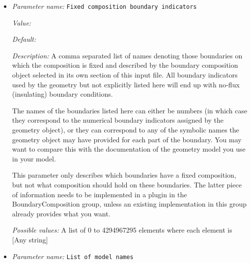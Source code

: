 \begin{itemize}
A warning for models with melt transport: In models with fluid flow, some compositional fields (in particular the porosity) might be transported with the fluid velocity, and would need to set the constraints based on the fluid velocity. However, this is currently not possible, because we reuse the same matrix for all compositional fields, and therefore can not use different constraints for different fields. Consequently, we set this parameter to true by default in models where melt transport is enabled. Be aware that if you change this default setting, you will not use the melt velocity, but the solid velocity to determine on which parts of the boundaries there is outflow.


{\it Possible values:} Any one of true, false, false for models without melt
\item {\it Parameter name:} {\tt Fixed composition boundary indicators}
\label{parameters:Boundary composition model/Fixed composition boundary indicators}
\label{parameters:Boundary_20composition_20model/Fixed_20composition_20boundary_20indicators}


{\it Value:} 


{\it Default:} 


{\it Description:} A comma separated list of names denoting those boundaries on which the composition is fixed and described by the boundary composition object selected in its own section of this input file. All boundary indicators used by the geometry but not explicitly listed here will end up with no-flux (insulating) boundary conditions.

The names of the boundaries listed here can either be numbers (in which case they correspond to the numerical boundary indicators assigned by the geometry object), or they can correspond to any of the symbolic names the geometry object may have provided for each part of the boundary. You may want to compare this with the documentation of the geometry model you use in your model.

This parameter only describes which boundaries have a fixed composition, but not what composition should hold on these boundaries. The latter piece of information needs to be implemented in a plugin in the BoundaryComposition group, unless an existing implementation in this group already provides what you want.


{\it Possible values:} A list of 0 to 4294967295 elements where each element is [Any string]
\item {\it Parameter name:} {\tt List of model names}
\label{parameters:Boundary composition model/List of model names}
\label{parameters:Boundary_20composition_20model/List_20of_20model_20names}



\end{itemize}
